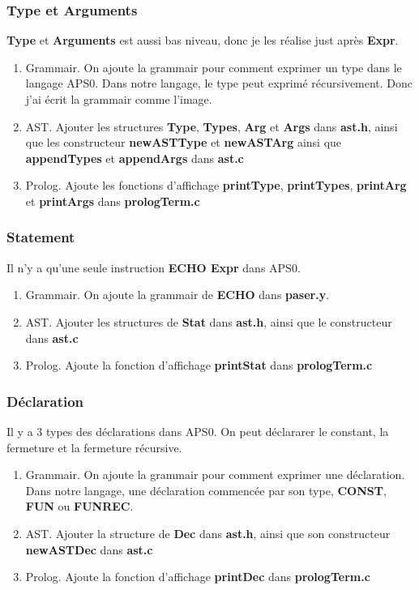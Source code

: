 \documentclass[14px]{article}
\begin{document}
\clearpage
\subsubsection{Type et Arguments}
\textbf{Type} et \textbf{Arguments} est aussi bas niveau, donc je les réalise just après \textbf{Expr}.
\begin{enumerate}
	\item  Grammair. On ajoute la grammair pour comment exprimer un type dans le langage APS0. Dans notre langage, le type peut exprimé récursivement. Donc j'ai écrit la grammair comme l'image.
	\item AST. Ajouter les structures  \textbf{Type}, \textbf{Types}, \textbf{Arg} et \textbf{Args} dans \textbf{ast.h}, ainsi que les constructeur \textbf{newASTType} et \textbf{newASTArg} ainsi que \textbf{appendTypes} et \textbf{appendArgs} dans \textbf{ast.c}
	\item Prolog. Ajoute les fonctions d'affichage \textbf{printType}, \textbf{printTypes}, \textbf{printArg} et \textbf{printArgs} dans \textbf{prologTerm.c}
\end{enumerate}

\subsubsection{Statement}
Il n'y a qu'une seule instruction \textbf{ECHO Expr} dans APS0.
\begin{enumerate}
	\item  Grammair.  On ajoute la grammair de \textbf{ECHO} dans \textbf{paser.y}.
	\item AST. Ajouter les structures de \textbf{Stat} dans \textbf{ast.h}, ainsi que le constructeur dans \textbf{ast.c}
	\item Prolog. Ajoute la fonction d'affichage \textbf{printStat} dans \textbf{prologTerm.c}
\end{enumerate}

\subsubsection{Déclaration}
Il y a 3 types des déclarations dans APS0. On peut déclararer le constant, la fermeture et la fermeture récursive.
\begin{enumerate}
	\item  Grammair. On ajoute la grammair pour comment exprimer une déclaration. Dans notre langage, une déclaration commencée par son type, \textbf{CONST}, \textbf{FUN} ou \textbf{FUNREC}. 
	\item AST. Ajouter la structure de \textbf{Dec} dans \textbf{ast.h}, ainsi que son constructeur \textbf{newASTDec} dans \textbf{ast.c}
	\item Prolog. Ajoute la fonction d'affichage \textbf{printDec} dans \textbf{prologTerm.c}
\end{enumerate}
\end{document}
